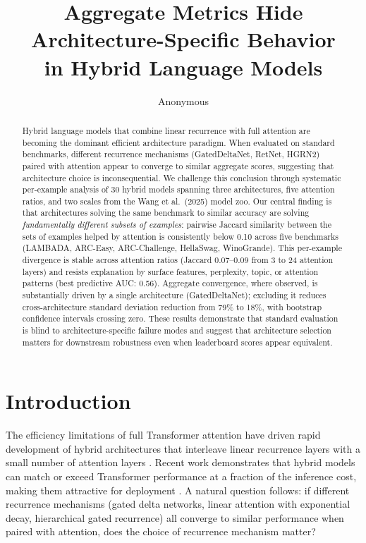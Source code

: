\documentclass[11pt]{article}
\title{Aggregate Metrics Hide Architecture-Specific Behavior\\in Hybrid Language Models}
\author{Anonymous}
\date{}
\begin{document}
\maketitle

\begin{abstract}
Hybrid language models that combine linear recurrence with full attention are becoming the dominant efficient architecture paradigm. When evaluated on standard benchmarks, different recurrence mechanisms (GatedDeltaNet, RetNet, HGRN2) paired with attention appear to converge to similar aggregate scores, suggesting that architecture choice is inconsequential. We challenge this conclusion through systematic per-example analysis of 30 hybrid models spanning three architectures, five attention ratios, and two scales from the Wang et al.\ (2025) model zoo. Our central finding is that architectures solving the same benchmark to similar accuracy are solving \emph{fundamentally different subsets of examples}: pairwise Jaccard similarity between the sets of examples helped by attention is consistently below 0.10 across five benchmarks (LAMBADA, ARC-Easy, ARC-Challenge, HellaSwag, WinoGrande). This per-example divergence is stable across attention ratios (Jaccard 0.07--0.09 from 3 to 24 attention layers) and resists explanation by surface features, perplexity, topic, or attention patterns (best predictive AUC: 0.56). Aggregate convergence, where observed, is substantially driven by a single architecture (GatedDeltaNet); excluding it reduces cross-architecture standard deviation reduction from 79\% to 18\%, with bootstrap confidence intervals crossing zero. These results demonstrate that standard evaluation is blind to architecture-specific failure modes and suggest that architecture selection matters for downstream robustness even when leaderboard scores appear equivalent.
\end{abstract}

\section{Introduction}

The efficiency limitations of full Transformer attention have driven rapid development of hybrid architectures that interleave linear recurrence layers with a small number of attention layers \citep{dao2024transformers,gu2024mamba}. Recent work demonstrates that hybrid models can match or exceed Transformer performance at a fraction of the inference cost, making them attractive for deployment \citep{waleffe2024empirical,de2024griffin}. A natural question follows: if different recurrence mechanisms (gated delta networks, linear attention with exponential decay, hierarchical gated recurrence) all converge to similar performance when paired with attention, does the choice of recurrence mechanism matter?
\end{document}

